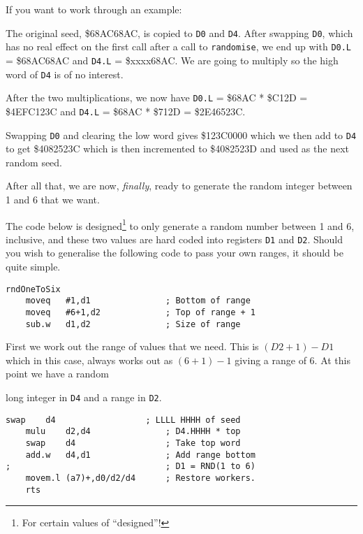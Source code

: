 If you want to work through an example:

The original seed, \$68AC68AC, is copied to \lstinline!D0! and \lstinline!D4!.
After swapping \lstinline!D0!, which has no real effect on the first
call after a call to \lstinline!randomise!, we end up with \lstinline!D0.L!
= \$68AC68AC and \lstinline!D4.L! = \$xxxx68AC. We are going to multiply
so the high word of \lstinline!D4! is of no interest.

After the two multiplications, we now have \lstinline!D0.L! = \$68AC
{*} \$C12D = \$4EFC123C and \lstinline!D4.L! = \$68AC {*} \$712D
= \$2E46523C.

Swapping \lstinline!D0! and clearing the low word gives \$123C0000
which we then add to \lstinline!D4! to get \$4082523C which is then
incremented to \$4082523D and used as the next random seed.

After all that, we are now, \emph{finally}, ready to generate the
random integer between 1 and 6 that we want.

The code below is designed\footnote{For certain values of ``designed''!}
to only generate a random number between 1 and 6, inclusive, and these
two values are hard coded into registers \lstinline!D1! and \lstinline!D2!.
Should you wish to generalise the following code to pass your own
ranges, it should be quite simple.

\begin{lstlisting}[caption={Rnd 1 to 6 function - Part 2},firstnumber=71]
rndOneToSix
    moveq   #1,d1               ; Bottom of range
    moveq   #6+1,d2             ; Top of range + 1
    sub.w   d1,d2               ; Size of range

\end{lstlisting}

First we work out the range of values that we need. This is $\left(D2+1\right)-D1$
which in this case, always works out as $\left(6+1\right)-1$ giving
a range of 6. At this point we have a random

long integer in \lstinline!D4! and a range in \lstinline!D2!.

\begin{lstlisting}[caption={Rnd 1 to 6 function - Part 3},firstnumber=75]
    swap    d4                  ; LLLL HHHH of seed
    mulu    d2,d4               ; D4.HHHH * top
    swap    d4                  ; Take top word
    add.w   d4,d1               ; Add range bottom
;                               ; D1 = RND(1 to 6)
    movem.l (a7)+,d0/d2/d4      ; Restore workers.
    rts

\end{lstlisting}

